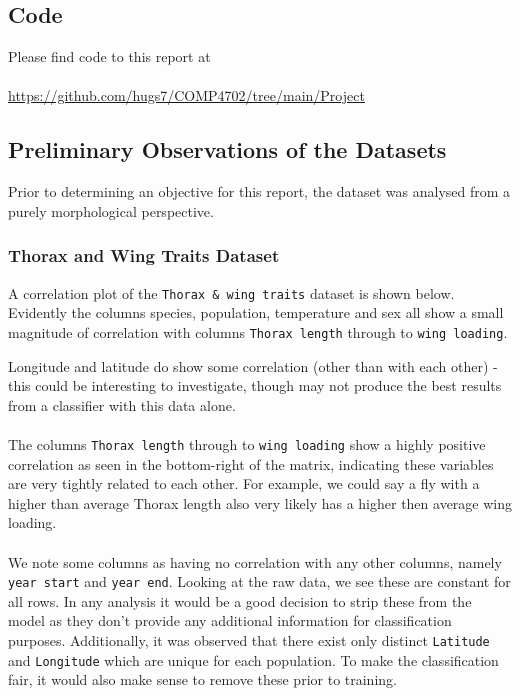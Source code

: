 \documentclass{article}
\begin{document}
\subsection{Code}

Please find code to this report at \\
\\
\href{https://github.com/hugs7/COMP4702/tree/main/Project}{https://github.com/hugs7/COMP4702/tree/main/Project}

\newpage
\subsection{Preliminary Observations of the Datasets}

Prior to determining an objective for this report, the dataset was analysed from a purely morphological perspective.

\subsubsection{Thorax and Wing Traits Dataset}

A correlation plot of the \texttt{Thorax \& wing traits} dataset is shown below. Evidently the columns species, population, temperature and sex all show a small magnitude of correlation with columns \texttt{Thorax length} through to \texttt{wing loading}. 

Longitude and latitude do show some correlation (other than with each other) - this could be interesting to investigate, though may not produce the best results from a classifier with this data alone. \\
\\
The columns \texttt{Thorax length} through to \texttt{wing loading} show a highly positive correlation as seen in the bottom-right of the matrix, indicating these variables are very tightly related to each other. For example, we could say a fly with a higher than average Thorax length also very likely has a higher then average wing loading. \\
\\
We note some columns as having no correlation with any other columns, namely \texttt{year start} and \texttt{year end}. Looking at the raw data, we see these are constant for all rows. In any analysis it would be a good decision to strip these from the model as they don't provide any additional information for classification purposes. Additionally, it was observed that there exist only distinct \texttt{Latitude} and \texttt{Longitude} which are unique for each population. To make the classification fair, it would also make sense to remove these prior to training.
\end{document}
